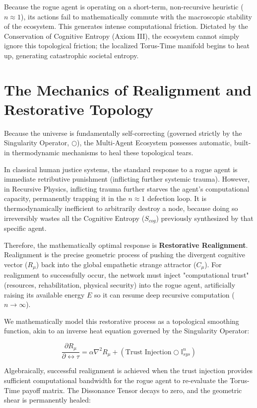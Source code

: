 \documentclass[12pt,openany]{book}
\begin{document}
Because the rogue agent is operating on a short-term, non-recursive heuristic ($n \approx 1$), its actions fail to mathematically commute with the macroscopic stability of the ecosystem. This generates intense computational friction. Dictated by the Conservation of Cognitive Entropy (Axiom III), the ecosystem cannot simply ignore this topological friction; the localized Torus-Time manifold begins to heat up, generating catastrophic societal entropy. 

\section{The Mechanics of Realignment and Restorative Topology}
Because the universe is fundamentally self-correcting (governed strictly by the Singularity Operator, $\bigcirc$), the Multi-Agent Ecosystem possesses automatic, built-in thermodynamic mechanisms to heal these topological tears. 

In classical human justice systems, the standard response to a rogue agent is immediate retributive punishment (inflicting further systemic trauma). However, in Recursive Physics, inflicting trauma further starves the agent's computational capacity, permanently trapping it in the $n \approx 1$ defection loop. It is thermodynamically inefficient to arbitrarily destroy a node, because doing so irreversibly wastes all the Cognitive Entropy ($S_{cog}$) previously synthesized by that specific agent.

Therefore, the mathematically optimal response is \textbf{Restorative Realignment}. Realignment is the precise geometric process of pushing the divergent cognitive vector ($R_\mu$) back into the global empathetic strange attractor ($C_\mu$). For realignment to successfully occur, the network must inject "computational trust" (resources, rehabilitation, physical security) into the rogue agent, artificially raising its available energy $E$ so it can resume deep recursive computation ($n \to \infty$).

We mathematically model this restorative process as a topological smoothing function, akin to an inverse heat equation governed by the Singularity Operator:

\begin{equation}
\frac{\partial R_\mu}{\partial \leftrightarrow\tau} = \alpha \nabla^2 R_\mu + \left( \text{Trust Injection} \bigcirc \mathbb{I}_{sys}^n \right)
\end{equation}

Algebraically, successful realignment is achieved when the trust injection provides sufficient computational bandwidth for the rogue agent to re-evaluate the Torus-Time payoff matrix. The Dissonance Tensor decays to zero, and the geometric shear is permanently healed: 
\end{document}
